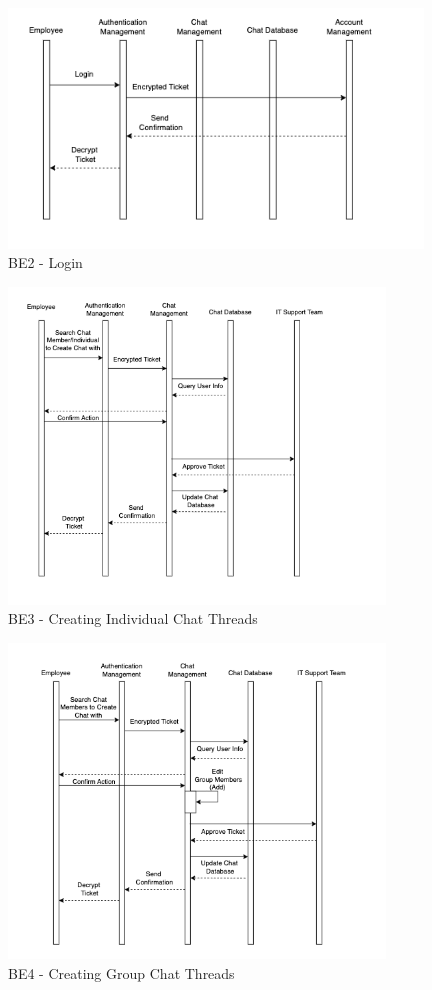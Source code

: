 \documentclass[]{article}
\begin{document}
\vspace{1 cm}
\begin{figure}[H]
	\centering
	\includegraphics[width=11cm]{BE2.png}
	\caption{BE2 - Login}
	\label{fig:galaxy}
\end{figure}



\begin{figure}[H]
	\centering
	\includegraphics[width=10cm]{BE3.png}
	\caption{BE3 - Creating Individual Chat Threads}
	\label{fig:galaxy}
\end{figure}


\begin{figure}[H]
	\centering
	\includegraphics[width=10cm]{BE4.png}
	\caption{BE4 - Creating Group Chat Threads}
	\label{fig:galaxy}
\end{figure}
\end{document}
